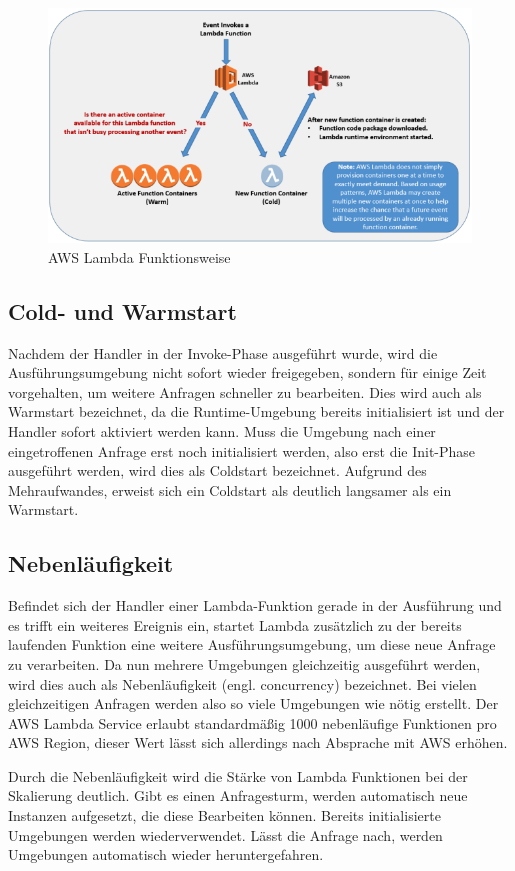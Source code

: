 \begin{figure}[H]
    \includegraphics[width=\textwidth]{img/lambda-architecture.png}
    
    \caption[AWS Lambda Funktionsweise]{AWS Lambda Funktionsweise\cite{noauthor_serverless_2017}}
    \label{fig:lambda-architecture}
\end{figure}

\subsection{Cold- und Warmstart}
Nachdem der Handler in der Invoke-Phase ausgeführt wurde, wird die Ausführungsumgebung nicht sofort wieder freigegeben, sondern für einige Zeit vorgehalten, um weitere Anfragen schneller zu bearbeiten. Dies wird auch als Warmstart bezeichnet, da die Runtime-Umgebung bereits initialisiert ist und der Handler sofort aktiviert werden kann.
Muss die Umgebung nach einer eingetroffenen Anfrage erst noch initialisiert werden, also erst die Init-Phase ausgeführt werden, wird dies als Coldstart bezeichnet. Aufgrund des Mehraufwandes, erweist sich ein Coldstart als deutlich langsamer als ein Warmstart.

\subsection{Nebenläufigkeit}
Befindet sich der Handler einer Lambda-Funktion gerade in der Ausführung und es trifft ein weiteres Ereignis ein, startet Lambda zusätzlich zu der bereits laufenden Funktion eine weitere Ausführungsumgebung, um diese neue Anfrage zu verarbeiten. Da nun mehrere Umgebungen gleichzeitig ausgeführt werden, wird dies auch als Nebenläufigkeit (engl. concurrency) bezeichnet. Bei vielen gleichzeitigen Anfragen werden also so viele Umgebungen wie nötig erstellt. Der AWS Lambda Service erlaubt standardmäßig 1000 nebenläufige Funktionen pro AWS Region, dieser Wert lässt sich allerdings nach Absprache mit AWS erhöhen.

Durch die Nebenläufigkeit wird die Stärke von Lambda Funktionen bei der Skalierung deutlich. Gibt es einen Anfragesturm, werden automatisch neue Instanzen aufgesetzt, die diese Bearbeiten können. Bereits initialisierte Umgebungen werden wiederverwendet. Lässt die Anfrage nach, werden Umgebungen automatisch wieder heruntergefahren. 